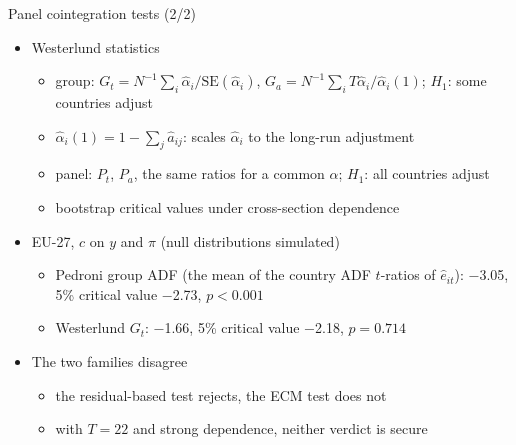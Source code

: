 \begin{frame}{Panel cointegration tests (2/2)}
\itemsize{\small}
\begin{itemize}
    \item Westerlund statistics
    \begin{itemize}
        \item group: $G_t = N^{-1}\sum_i\hat\alpha_i/\mathrm{SE}(\hat\alpha_i)$, $G_a = N^{-1}\sum_i T\hat\alpha_i/\hat\alpha_i(1)$; $H_1$: some countries adjust
        \item $\hat\alpha_i(1) = 1 - \sum_j\hat a_{ij}$: scales $\hat\alpha_i$ to the long-run adjustment
        \item panel: $P_t$, $P_a$, the same ratios for a common $\alpha$; $H_1$: all countries adjust
        \item bootstrap critical values under cross-section dependence
    \end{itemize}
    \item EU-27, $c$ on $y$ and $\pi$ (null distributions simulated)
    \begin{itemize}
        \item Pedroni group ADF (the mean of the country ADF $t$-ratios of $\hat e_{it}$): \ensuremath{-}3.05, 5\% critical value \ensuremath{-}2.73, $p < 0.001$
        \item Westerlund $G_t$: \ensuremath{-}1.66, 5\% critical value \ensuremath{-}2.18, $p = 0.714$
    \end{itemize}
    \item The two families disagree
    \begin{itemize}
        \item the residual-based test rejects, the ECM test does not
        \item with $T = 22$ and strong dependence, neither verdict is secure
    \end{itemize}
\end{itemize}
\end{frame}

